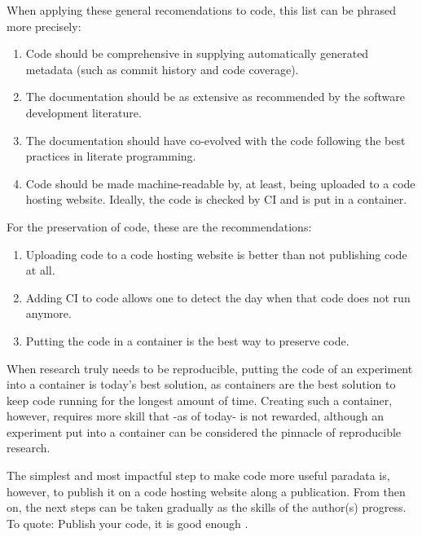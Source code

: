 When applying these general recomendations to code, 
this list can be phrased more precisely:

\begin{enumerate}
  \item Code should be comprehensive 
    in supplying automatically generated metadata (such as commit history and code coverage).
  \item The documentation should be as extensive as recommended by the 
    software development literature.
  \item The documentation should have co-evolved with the
    code following the best practices in literate programming. 
  \item Code should be made machine-readable by, at least,
    being uploaded to a code hosting website.
    Ideally, the code is checked by CI and is put in a container.
\end{enumerate}

For the preservation of code, these are the recommendations:

\begin{enumerate}
  \item Uploading code to a code hosting website is better than
    not publishing code at all.
  \item Adding CI to code allows one to detect the day when that code 
    does not run anymore.
  \item Putting the code in a container is the best way to preserve code.
\end{enumerate}


When research truly needs to be reproducible, putting the code 
of an experiment into a container is today's best solution,
as containers are the best solution to keep code running for the longest 
amount of time.
Creating such a container, however, requires more skill
that -as of today- is not rewarded,
although an experiment put into a container 
can be considered the pinnacle of reproducible research.


The simplest and most impactful step to make code more useful paradata
is, however, to publish it on a code hosting website 
along a publication. From then on, the next steps can be taken 
gradually as the skills of the author(s) progress.
To quote: Publish your code, it is good enough \cite{barnes2010publish}.

